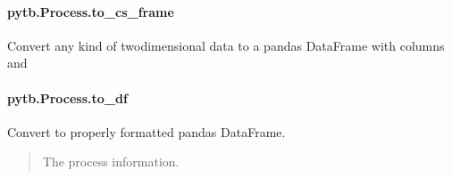 \documentclass[letterpaper,10pt,english,openany,oneside]{sphinxmanual}
\begin{document}
\begin{fulllineitems}
\begin{fulllineitems}
\begin{quote}
\begin{description}
\begin{itemize}
\end{itemize}

\end{description}\end{quote}

\end{fulllineitems}


\sphinxstepscope


\paragraph{pytb.Process.to\_cs\_frame}
\label{\detokenize{api/pytb.Process.to_cs_frame:pytb-process-to-cs-frame}}\label{\detokenize{api/pytb.Process.to_cs_frame::doc}}

\begin{fulllineitems}
\label{\detokenize{api/pytb.Process.to_cs_frame:pytb.Process.to_cs_frame}}
\pysigstartsignatures
{}
\pysigstopsignatures
\sphinxAtStartPar
Convert any kind of two\sphinxhyphen{}dimensional data to a pandas
DataFrame with columns  and 

\end{fulllineitems}


\sphinxstepscope


\paragraph{pytb.Process.to\_df}
\label{\detokenize{api/pytb.Process.to_df:pytb-process-to-df}}\label{\detokenize{api/pytb.Process.to_df::doc}}

\begin{fulllineitems}
\label{\detokenize{api/pytb.Process.to_df:pytb.Process.to_df}}
\pysigstartsignatures
{}
\pysigstopsignatures
\sphinxAtStartPar
Convert to properly formatted pandas DataFrame.
\begin{quote}\begin{description}
\sphinxAtStartPar
The process information.


\end{description}
\end{quote}
\end{fulllineitems}
\end{fulllineitems}
\end{document}
